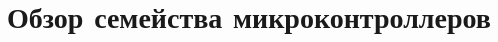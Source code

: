 



\mytitle{\ }
\maketitle
\tableofcontents
\listoflab

\part{Обзор семейства микроконтроллеров \cx}



% 
% 
% 
% 

